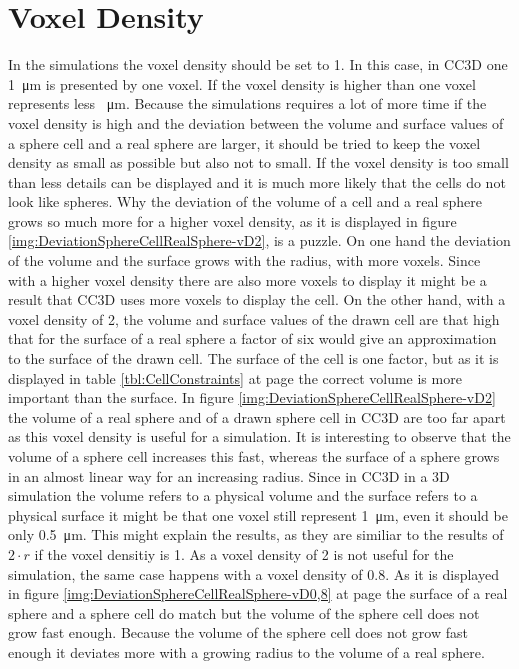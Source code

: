\section{Voxel Density}\label{sec:vD}
In the simulations the voxel density should be set to 1. In this case, in \ac{CC3D} one \SI{1}{\micro\metre} is presented by one voxel. If the voxel density is higher than one voxel represents less \SI{}{\micro\metre}. Because the simulations requires a lot of more time if the voxel density is high and the deviation between the volume and surface values of a sphere cell and a real sphere are larger, it should be tried to keep the voxel density as small as possible but also not to small. If the voxel density is too small than less details can be displayed and it is much more likely that the cells do not look like spheres. Why the deviation of the volume of a cell and a real sphere grows so much more for a higher voxel density, as it is displayed in figure \ref{img:DeviationSphereCellRealSphere-vD2}, is a puzzle. \newline
On one hand the deviation of the volume and the surface grows with the radius, with more voxels. Since with a higher voxel density there are also more voxels to display it might be a result that \ac{CC3D} uses more voxels to display the cell. On the other hand, with a voxel density of 2, the volume and surface values of the drawn cell are that high that for the surface of a real sphere a factor of six would give an approximation to the surface of the drawn cell. \newline
The surface of the cell is one factor, but as it is displayed in table \ref{tbl:CellConstraints} at page \pageref{tbl:CellConstraints} the correct volume is more important than the surface. In figure \ref{img:DeviationSphereCellRealSphere-vD2} the volume of a real sphere and of a drawn sphere cell in \ac{CC3D} are too far apart as this voxel density is useful for a simulation. It is interesting to observe that the volume of a sphere cell increases this fast, whereas the surface of a sphere grows in an almost linear way for an increasing radius. Since in \ac{CC3D} in a 3D simulation the volume refers to a physical volume and the surface refers to a physical surface it might be that one voxel still represent \SI{1}{\micro\metre}, even it should be only \SI{0.5}{\micro\metre}. This might explain the results, as they are similiar to the results of $2 \cdot r$ if the voxel densitiy is 1. \newline
As a voxel density of 2 is not useful for the simulation, the same case happens with a voxel density of 0.8. As it is displayed in figure \ref{img:DeviationSphereCellRealSphere-vD0,8} at page \pageref{img:DeviationSphereCellRealSphere-vD0,8} the surface of a real sphere and a sphere cell do match but the volume of the sphere cell does not grow fast enough. Because the volume of the sphere cell does not grow fast enough it deviates more with a growing radius to the volume of a real sphere. \newline
